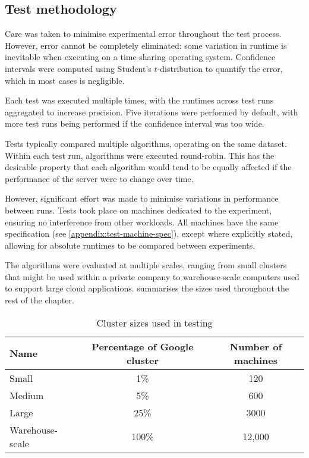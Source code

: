 \subsection{Test methodology}

Care was taken to minimise experimental error throughout the test process. However, error cannot be completely eliminated: some variation in runtime is inevitable when executing on a time-sharing operating system. Confidence intervals were computed using Student's $t$-distribution to quantify the error, which in most cases is negligible.

Each test was executed multiple times, with the runtimes across test runs aggregated to increase precision. Five iterations were performed by default, with more test runs being performed if the confidence interval was too wide.

Tests typically compared multiple algorithms, operating on the same dataset. Within each test run, algorithms were executed round-robin. This has the desirable property that each algorithm would tend to be equally affected if the performance of the server were to change over time.

However, significant effort was made to minimise variations in performance between runs. Tests took place on machines dedicated to the experiment, ensuring no interference from other workloads. All machines have the same specification (see \cref{appendix:test-machine-spec}), except where explicitly stated, allowing for absolute runtimes to be compared between experiments.

The algorithms were evaluated at multiple scales, ranging from small clusters that might be used within a private company to warehouse-scale computers used to support large cloud applications.  summarises the sizes used throughout the rest of the chapter.

\begin{table}
    \centering
    \begin{tabular}{lcc}
        \textbf{Name} & \textbf{Percentage of Google cluster} & \textbf{Number of machines} \tabularnewline
        \hline
        Small & 1\% & 120 \tabularnewline
        Medium & 5\% & 600 \tabularnewline
        Large & 25\% & 3000 \tabularnewline 
        Warehouse-scale & 100\% & 12,000 \tabularnewline
    \end{tabular}
    \caption{Cluster sizes used in testing}
    \label{table:cluster-sizes}
\end{table}

